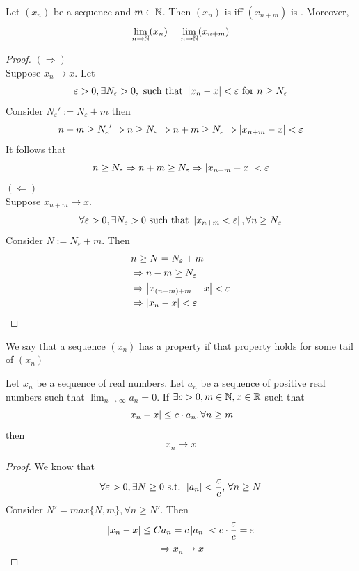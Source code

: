 \documentclass[a4paper,12pt]{article}
\begin{document}
\begin{theorem}
    Let \((x_n)\) be a sequence and \(m\in\mathbb{N}\). Then \((x_n)\) is  iff \((x_{n+m})\) is . 
    Moreover,\[\lim_{n\to\mathbb{N}}(x_n) = \lim_{n\to\mathbb{N}}(x_{n+m})\]
\end{theorem}

\begin{proof}
    \((\Rightarrow)\)\\
    Suppose \(x_n\to x\). Let\[\varepsilon>0, \exists N_\varepsilon >0, \text{ such that } \left\lvert x_n-x\right\rvert<\varepsilon \text{ for }n\ge N_\varepsilon\]
    Consider \({N_\varepsilon}':=N_\varepsilon + m\) then
    \[n+m \ge {N_\varepsilon}' \Rightarrow n\ge N_\varepsilon \Rightarrow n+m\ge N_\varepsilon \Rightarrow \left\lvert x_{n+m}-x\right\rvert<\varepsilon\]
    It follows that \[n\ge N_\varepsilon \Rightarrow n+m \ge N_\varepsilon \Rightarrow \left\lvert x_{n+m}-x\right\rvert<\varepsilon\]
    \newpage
    \((\Leftarrow)\)\\
    Suppose \(x_{n+m}\rightarrow x\).
    \[\forall \varepsilon>0,\exists N_\varepsilon>0 \text{ such that } \left\lvert x_{n+m}<\varepsilon\right\rvert, \forall n\ge N_\varepsilon\]
    Consider \(N:=N_\varepsilon+m\). Then 
    \begin{align*}
        & n\ge N = N_\varepsilon+m \\
        & \Rightarrow n-m \ge N_\varepsilon \\
        & \Rightarrow\left\lvert x_{(n-m)+m}-x\right\rvert<\varepsilon \\
        & \Rightarrow\left\lvert x_n-x\right\rvert<\varepsilon
    \end{align*}
\end{proof}

\begin{remark}
    We say that a sequence \((x_n)\)  has a property if that property holds for some tail of \((x_n)\)\\
\end{remark}

\begin{theorem}
    Let \(x_n\) be a sequence of real numbers. 
    Let \(a_n\) be a sequence of positive real numbers such that \(\lim_{n\to \infty}a_n=0\).
    If \(\exists c>0, m\in \mathbb{N}, x\in \mathbb{R}\) such that \[\left\lvert x_n-x\right\rvert \le c\cdot a_n,\forall n\ge m\]
    then \[x_n\to x\]
\end{theorem}

\begin{proof}
    We know that
    \[\forall \varepsilon>0, \exists N\ge 0\text{ s.t. } \left\lvert a_n\right\rvert<\frac{\varepsilon}{c},\, \forall n\ge N\]
    Consider \(N'=max\{N,m\}, \forall n\ge N'\). Then 
    \[\left\lvert x_n-x\right\rvert\le Ca_n = c\left\lvert a_n\right\rvert<c\cdot\frac{\varepsilon}{c} = \varepsilon\]
    \[\Rightarrow x_n\rightarrow x\]
\end{proof}
\end{document}

